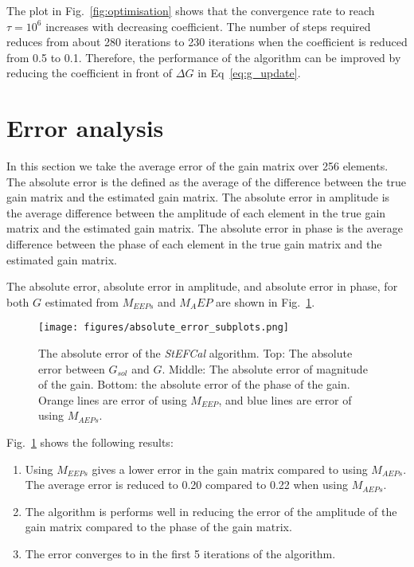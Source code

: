\documentclass[10pt,a4paper,twocolumn]{paper}
\begin{document}
The plot in Fig.~\ref{fig:optimisation} shows that the convergence rate to reach $\tau = 10^6$ increases with decreasing coefficient. The number of steps required reduces from about 280 iterations to 230 iterations when the coefficient is reduced from 0.5 to 0.1. Therefore, the performance of the algorithm can be improved by reducing the coefficient in front of $\Delta G$ in Eq~\ref{eq:g_update}.

\section{Error analysis}

In this section we take the average error of the gain matrix over 256 elements. The absolute error is the defined as the average of the difference between the true gain matrix and the estimated gain matrix. The absolute error in amplitude is the average difference between the amplitude of each element in the true gain matrix and the estimated gain matrix. The absolute error in phase is the average difference between the phase of each element in the true gain matrix and the estimated gain matrix.

The absolute error, absolute error in amplitude, and absolute error in phase, for both $G$ estimated from $M_{EEPs}$ and $M_AEP$ are shown in Fig.~\ref{fig:absolute_error_subplots}. 

\begin{figure}[H]
    \centering
    \texttt{[image: figures/absolute\_error\_subplots.png]}
    \caption{The absolute error of the \textit{StEFCal} algorithm. Top: The absolute error between $G_{sol}$ and $G$. Middle: The absolute error of magnitude of the gain. Bottom: the absolute error of the phase of the gain. Orange lines are error of using $M_{EEP}$, and blue lines are error of using $M_{AEPs}$.}
    \label{fig:absolute_error_subplots}
\end{figure}

Fig.~\ref{fig:absolute_error_subplots} shows the following results:

\begin{enumerate}
    \item Using $M_{EEPs}$ gives a lower error in the gain matrix compared to using $M_{AEPs}$. The average error is reduced to 0.20 compared to 0.22 when using $M_{AEPs}$.
    \item The algorithm is performs well in reducing the error of the amplitude of the gain matrix compared to the phase of the gain matrix.
    \item The error converges to in the first 5 iterations of the algorithm.
\end{enumerate}
\end{document}
